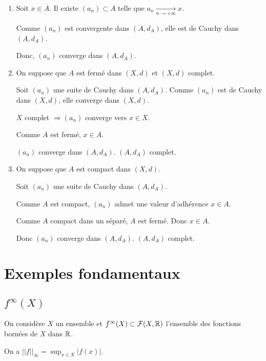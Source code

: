 \documentclass[french,a4paper,10pt]{article}
\begin{document}
    \begin{myproof}\,
        \begin{enumerate}
            \item Soit $x\in \overline A$. Il existe $(a_n)\subset A$ telle que $a_n\xrightarrow[n\to+\infty]{}x$.

            Comme $(a_n)$ est convergente dans $(A,d_A)$, elle est de Cauchy dans $(A,d_A)$.

            Donc, $(a_n)$ converge dans $(A,d_A)$.

            \item On suppose que $A$ est fermé dans $(X,d)$ et $(X,d)$ complet.

            Soit $(a_n)$ une suite de Cauchy dans $(A,d_A)$. Comme $(a_n)$ est de Cauchy dans $(X,d)$, elle converge dans $(X,d)$.

            $X$ complet $\Rightarrow (a_n)$ converge vers $x\in X$.

            Comme $A$ est fermé, $x\in A$.

            $(a_n)$ converge dans $(A,d_A)$. $(A,d_A)$ complet.

            \item On suppose que $A$ est compact dans $(X,d)$.

            Soit $(a_n)$ une suite de Cauchy dans $(A,d_A)$.

            Comme $A$ est compact, $(a_n)$ admet une valeur d'adhérence $x\in A$.

            Comme $A$ compact dans un séparé, $A$ est fermé. Donc $x\in A$.

            Donc $(a_n)$ converge dans $(A,d_A)$. $(A,d_A)$ complet.
        \end{enumerate}
    \end{myproof}

    \section{Exemples fondamentaux}

    \subsection{$f^\infty(X)$}

    On considère $X$ un ensemble et $f^\infty(X)\subset \mathcal F(X,\mathbb{R})$ l'ensemble des fonctions bornées de $X$ dans $\mathbb{R}$.

    On a $||f||_\infty = \sup_{x\in X}|f(x)|$.
\end{document}
